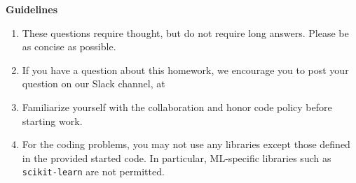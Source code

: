 {\bf Guidelines}
\begin{enumerate}[itemsep=2pt]
    \item These questions require thought, but do not require long answers. Please be as concise as possible.
    \item If you have a question about this homework, we encourage you to post your question on our Slack channel, at \slack
    \item Familiarize yourself with the collaboration and honor code policy before starting work.
    \item For the coding problems, you may not use any libraries except those defined in the provided started code. In particular, ML-specific libraries such as \texttt{scikit-learn} are not permitted.
\end{enumerate}
